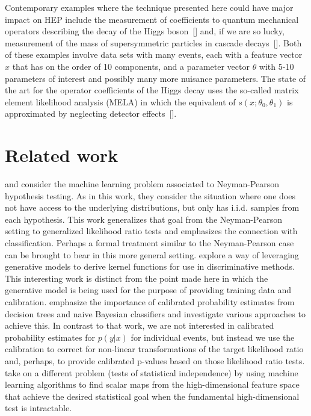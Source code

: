 \documentclass[aoas,preprint]{imsart}
\newcommand{\citek}[1]{[\cite{#1}]}
\numberwithin{equation}{section}
\theoremstyle{plain}
\begin{document}
Contemporary examples where the technique presented here could have major impact on HEP include the measurement of coefficients to quantum mechanical operators describing the decay of the Higgs boson~\citek{Chen:2014pia} and, if we are so lucky, measurement of the mass of supersymmetric particles in cascade decays~\citek{Allanach:2000kt}.  Both of these examples involve data sets with many events, each with a feature vector $x$ that has on the order of 10 components, and a parameter vector $\theta$ with 5-10 parameters of interest and possibly many more nuisance parameters. 
The state of the art for the operator coefficients of the Higgs decay uses the so-called matrix element likelihood analysis (MELA) in which the equivalent of $s(x; \theta_0, \theta_1)$ is approximated by neglecting detector effects~\citek{Gao:2010qx,Bolognesi:2012mm}. 

\bigskip

\section{Related work}\label{S:Related}


\cite{ClaytonScott} and \cite{JMLR:v14:tong13a} consider the machine learning problem associated to Neyman-Pearson hypothesis testing. As in this work, they consider the situation where one does not have access to the underlying distributions, but only has i.i.d. samples from each hypothesis. This work generalizes that goal from the Neyman-Pearson setting to generalized likelihood ratio tests and emphasizes the connection with classification. Perhaps a  formal treatment similar to the Neyman-Pearson case can be brought to bear in this more general setting.
\cite{TommiJaakkola} explore a way of leveraging generative models to derive kernel functions for use in discriminative methods. This interesting work is distinct from the point made here in which the generative model is being used for the purpose of providing training data and calibration.  
\cite{BiancaZadrozny} emphasize the importance of calibrated probability estimates from decision trees and naive Bayesian classifiers and investigate various approaches to achieve this. In contrast to that work, we are not interested in calibrated probability estimates for $p(y|x)$ for individual events, but instead we use the calibration to correct for non-linear transformations of the target likelihood ratio and, perhaps, to provide calibrated p-values based on those likelihood ratio tests. \cite{Ihler2004} take on a different problem (tests of statistical independence) by using machine learning algorithms to find  scalar maps from the high-dimensional feature space that achieve the desired statistical goal when the fundamental high-dimensional test is intractable.
\end{document}
